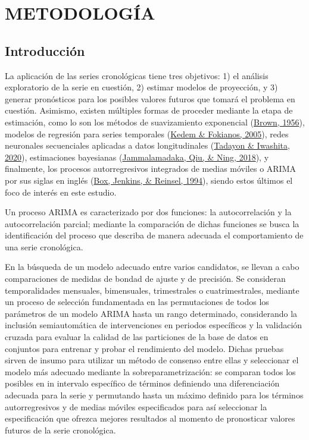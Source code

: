 \documentclass[
]{article}
\begin{document}
\newpage

\section{METODOLOGÍA}

\subsection{Introducción}

La aplicación de las series cronológicas tiene tres objetivos: 1) el
análisis exploratorio de la serie en cuestión, 2) estimar modelos de
proyección, y 3) generar pronósticos para los posibles valores futuros
que tomará el problema en cuestión. Asimismo, existen múltiples formas
de proceder mediante la etapa de estimación, como lo son los métodos de
suavizamiento exponencial (\protect\hyperlink{ref-brown}{Brown, 1956}),
modelos de regresión para series temporales
(\protect\hyperlink{ref-kedem}{Kedem \& Fokianos, 2005}), redes
neuronales secuenciales aplicadas a datos longitudinales
(\protect\hyperlink{ref-redes}{Tadayon \& Iwashita, 2020}), estimaciones
bayesianas (\protect\hyperlink{ref-bayes}{Jammalamadaka, Qiu, \& Ning,
2018}), y finalmente, los procesos autorregresivos integrados de medias
móviles o ARIMA por sus siglas en inglés
(\protect\hyperlink{ref-box-jenkins}{Box, Jenkins, \& Reinsel, 1994}),
siendo estos últimos el foco de interés en este estudio.

Un proceso ARIMA es caracterizado por dos funciones: la autocorrelación
y la autocorrelación parcial; mediante la comparación de dichas
funciones se busca la identificación del proceso que describa de manera
adecuada el comportamiento de una serie cronológica.

En la búsqueda de un modelo adecuado entre varios candidatos, se llevan
a cabo comparaciones de medidas de bondad de ajuste y de precisión. Se
consideran temporalidades mensuales, bimensuales, trimestrales o
cuatrimestrales, mediante un proceso de selección fundamentada en las
permutaciones de todos los parámetros de un modelo ARIMA hasta un rango
determinado, considerando la inclusión semiautomática de intervenciones
en periodos específicos y la validación cruzada para evaluar la calidad
de las particiones de la base de datos en conjuntos para entrenar y
probar el rendimiento del modelo. Dichas pruebas sirven de insumo para
utilizar un método de consenso entre ellas y seleccionar el modelo más
adecuado mediante la sobreparametrización: se comparan todos los
posibles en in intervalo específico de términos definiendo una
diferenciación adecuada para la serie y permutando hasta un máximo
definido para los términos autorregresivos y de medias móviles
especificados para así seleccionar la especificación que ofrezca mejores
resultados al momento de pronosticar valores futuros de la serie
cronológica.
\end{document}
